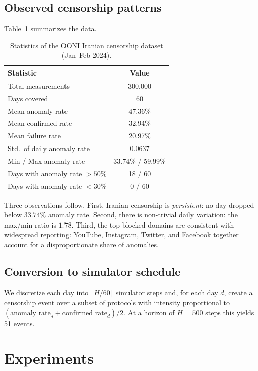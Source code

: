 \documentclass[11pt,a4paper]{article}
\begin{document}
\subsection{Observed censorship patterns}

Table~\ref{tab:ooni} summarizes the data.

\begin{table}[h]
\centering
\caption{Statistics of the OONI Iranian censorship dataset
(Jan--Feb 2024).}
\label{tab:ooni}
\begin{tabular}{lc}
\toprule
Statistic & Value \\
\midrule
Total measurements          & 300{,}000 \\
Days covered                & 60 \\
Mean anomaly rate           & 47.36\% \\
Mean confirmed rate         & 32.94\% \\
Mean failure rate           & 20.97\% \\
Std.\ of daily anomaly rate & 0.0637 \\
Min / Max anomaly rate      & 33.74\% / 59.99\% \\
Days with anomaly rate $> 50\%$ & 18 / 60 \\
Days with anomaly rate $< 30\%$ & 0 / 60 \\
\bottomrule
\end{tabular}
\end{table}

Three observations follow. First, Iranian censorship is
\emph{persistent}: no day dropped below $33.74\%$ anomaly rate.
Second, there is non-trivial daily variation: the max/min ratio is
$1.78$. Third, the top blocked domains are consistent with
widespread reporting: YouTube, Instagram, Twitter, and Facebook
together account for a disproportionate share of anomalies.

\subsection{Conversion to simulator schedule}

We discretize each day into $\lceil H / 60 \rceil$ simulator steps
and, for each day $d$, create a censorship event over a subset of
protocols with intensity proportional to
$(\text{anomaly\_rate}_d + \text{confirmed\_rate}_d)/2$.
At a horizon of $H = 500$ steps this yields 51 events.

\section{Experiments}
\label{sec:experiments}
\end{document}
